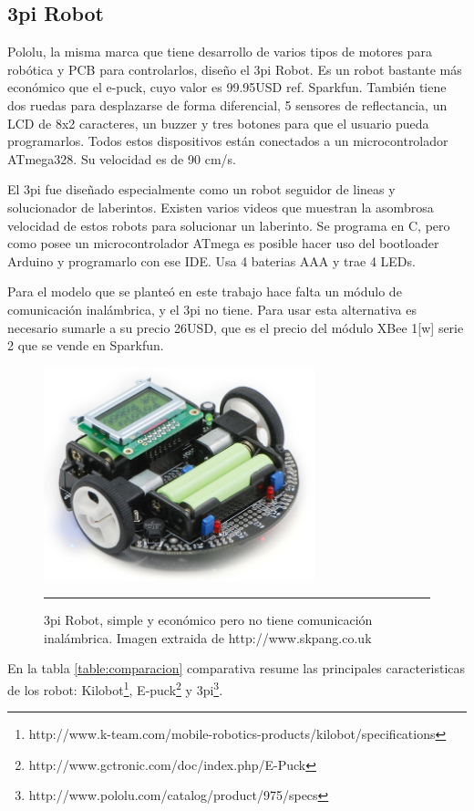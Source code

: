 \subsection{3pi Robot}

Pololu, la misma marca que tiene desarrollo de varios tipos de motores para robótica y PCB para controlarlos, diseño el 3pi Robot. Es un robot bastante más económico que el e-puck, cuyo valor es 99.95USD ref. Sparkfun. También tiene dos ruedas para desplazarse de forma diferencial, 5 sensores de reflectancia, un LCD de 8x2 caracteres, un buzzer y tres botones para que el usuario pueda programarlos. Todos estos dispositivos están conectados a un microcontrolador ATmega328. Su velocidad es de 90 cm/s.

El 3pi fue diseñado especialmente como un robot seguidor de lineas y solucionador de laberintos. Existen varios videos que muestran la asombrosa velocidad de estos robots para solucionar un laberinto. Se programa en C, pero como posee un microcontrolador ATmega es posible hacer uso del bootloader Arduino y programarlo con ese IDE. Usa 4 baterias AAA y trae 4 LEDs.

Para el modelo que se planteó en este trabajo hace falta un módulo de comunicación inalámbrica, y el 3pi no tiene. Para usar esta alternativa es necesario sumarle a su precio 26USD, que es el precio del módulo XBee 1[w] serie 2 que se vende en Sparkfun.

\begin{figure}[htbp]
	\centering
		\includegraphics[width=0.7\textwidth]{./Figures/3pi.jpg}
		\rule{35em}{0.5pt} 
	\caption[3pi]{3pi Robot, simple y económico pero no tiene comunicación inalámbrica. Imagen extraida de http://www.skpang.co.uk}
	\label{fig:3pi}
\end{figure}

En la tabla \ref{table:comparacion} comparativa resume las principales caracteristicas de los robot: Kilobot\footnote{http://www.k-team.com/mobile-robotics-products/kilobot/specifications}, E-puck\footnote{http://www.gctronic.com/doc/index.php/E-Puck} y 3pi\footnote{http://www.pololu.com/catalog/product/975/specs}.

